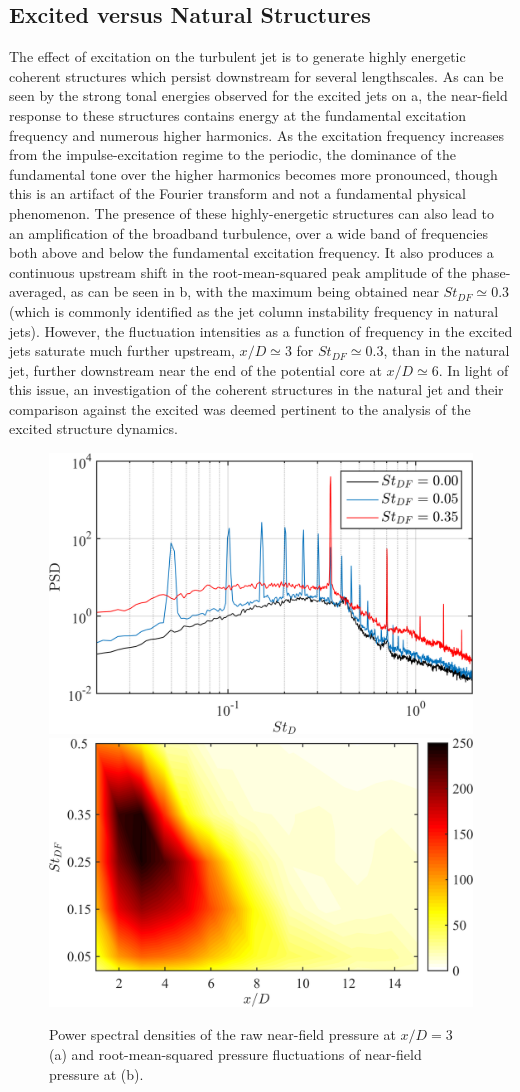 \subsection{Excited versus Natural Structures}
The effect of excitation on the turbulent jet is to generate highly energetic coherent structures which persist downstream for several lengthscales. As can be seen by the strong tonal energies observed for the excited jets on a, the near-field response to these structures contains energy at the fundamental excitation frequency and numerous higher harmonics. As the excitation frequency increases from the impulse-excitation regime to the periodic, the dominance of the fundamental tone over the higher harmonics becomes more pronounced, though this is an artifact of the Fourier transform and not a fundamental physical phenomenon. The presence of these highly-energetic structures can also lead to an amplification of the broadband turbulence, over a wide band of frequencies both above and below the fundamental excitation frequency. It also produces a continuous upstream shift in the root-mean-squared peak amplitude of the phase-averaged, as can be seen in b, with the maximum being obtained near $St_{DF} \simeq 0.3$ (which is commonly identified as the jet column instability frequency in natural jets). However, the fluctuation intensities as a function of frequency in the excited jets saturate much further upstream, $x/D \simeq 3$ for $St_{DF} \simeq 0.3$,  than in the natural jet, further downstream near the end of the potential core at $x/D \simeq 6$. In light of this issue, an investigation of the coherent structures in the natural jet and their comparison against the excited was deemed pertinent to the analysis of the excited structure dynamics.
\begin{figure}
	\centering
	\includegraphics[width=0.44\linewidth]{Figures/sect_nearfield_spectra.png}
	\includegraphics[width=0.46\linewidth]{Figures/sect_nearfield_prms.png}
	\caption{Power spectral densities of the raw near-field pressure at $x/D = 3$ (a) and root-mean-squared pressure fluctuations of near-field pressure at (b).}
	\label{fig:sect_nearfield_spectra_prms}
\end{figure}

